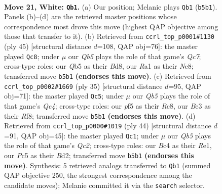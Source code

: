 \documentclass[11pt]{article}
\begin{document}
\clearpage

\begin{figure}[p]\centering
\begin{subfigure}{0.46\textwidth}\centering
\resizebox{\linewidth}{!}{%
\newchessgame
\chessboard[
  setfen={1nbq1kr1/1p2n3/4p3/rQP1Pp2/p1B2N2/P3B3/2P2KPp/R6R w - - 2 21},
  showmover=false,
  pgfstyle=straightmove, color=movearrow, markmove={b5-b1}
]}
\caption{}
\end{subfigure}\hfill
\begin{subfigure}{0.46\textwidth}\centering
\resizebox{\linewidth}{!}{%
\newchessgame
\chessboard[
  setfen={r2bn1rk/1p3p1p/5P2/p3p3/Pn2N2Q/8/1PqRB1PP/5R1K b - - 1 23},
  showmover=false,
  pgfstyle=straightmove, color=movearrow, markmove={c2-c8}
]}
\caption{}
\end{subfigure}
\\[4pt]
\begin{subfigure}{0.46\textwidth}\centering
\resizebox{\linewidth}{!}{%
\newchessgame
\chessboard[
  setfen={2r2rk1/pp2pp2/3pb1p1/4q2n/3RPP2/4Q3/PPP1N2P/2K2BR1 b - - 0 18},
  showmover=false,
  pgfstyle=straightmove, color=movearrow, markmove={e5-c5}
]}
\caption{}
\end{subfigure}\hfill
\begin{subfigure}{0.46\textwidth}\centering
\resizebox{\linewidth}{!}{%
\newchessgame
\chessboard[
  setfen={6k1/2nrq1pp/5n2/p1p1p1N1/2Pb4/P5PP/1rQB1PBK/4RR2 w - - 0 23},
  showmover=false,
  pgfstyle=straightmove, color=movearrow, markmove={c2-c1}
]}
\caption{}
\end{subfigure}
\caption{\textbf{Move 21, White: \texttt{Qb1}.} (a) Our position; Melanie plays \texttt{Qb1} (\texttt{b5b1}). Panels (b)--(d) are the retrieved master positions whose correspondence most drove this move (highest QAP objective among those that transfer to it). (b) Retrieved from \texttt{ccrl\_top\_p0001\#1130} (ply 45) [structural distance $d$=108, QAP obj=76]: the master played \texttt{Qc8}; under $\mu$ our \emph{Qb5} plays the role of that game's \emph{Qc7}; cross-type roles: our \emph{Q}b5 as their \emph{B}d8, our \emph{R}a1 as their \emph{N}e8; transferred move \texttt{b5b1} \textbf{(endorses this move)}. (c) Retrieved from \texttt{ccrl\_top\_p0002\#1669} (ply 35) [structural distance $d$=95, QAP obj=71]: the master played \texttt{Qc5}; under $\mu$ our \emph{Qb5} plays the role of that game's \emph{Qe4}; cross-type roles: our \emph{p}f5 as their \emph{R}c8, our \emph{B}e3 as their \emph{R}f8; transferred move \texttt{b5b1} \textbf{(endorses this move)}. (d) Retrieved from \texttt{ccrl\_top\_p0000\#1019} (ply 44) [structural distance $d$=91, QAP obj=45]: the master played \texttt{Qc1}; under $\mu$ our \emph{Qb5} plays the role of that game's \emph{Qc2}; cross-type roles: our \emph{B}c4 as their \emph{R}e1, our \emph{P}c5 as their \emph{B}d2; transferred move \texttt{b5b1} \textbf{(endorses this move)}. Synthesis: 5 retrieved analogs transferred to \texttt{Qb1} (summed QAP objective 250, the strongest correspondence among the candidate moves); Melanie committed it via the \texttt{search} selector.}
\label{fig:thought-m40}
\end{figure}
\end{document}
